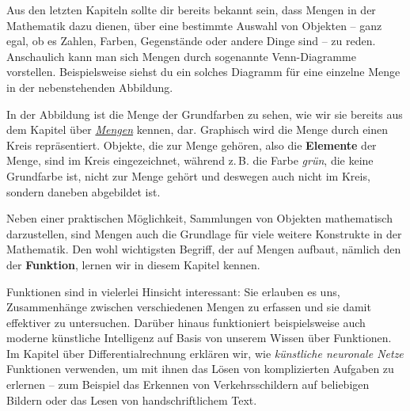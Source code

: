 \documentclass[../../main.tex]{subfiles}
\begin{document}
\label{sec:abbildungen_intuition}
Aus den letzten Kapiteln sollte dir bereits bekannt sein, dass Mengen in der Mathematik dazu dienen, über eine bestimmte Auswahl von Objekten -- ganz egal, ob es Zahlen, Farben, Gegenstände oder andere Dinge sind -- zu reden. Anschaulich kann man sich Mengen durch sogenannte Venn-Diagramme vorstellen. Beispielsweise siehst du ein solches Diagramm für eine einzelne Menge in der nebenstehenden Abbildung.


In der Abbildung ist die Menge der Grundfarben zu sehen, wie wir sie bereits aus dem Kapitel über \href{ch:mengen}{\emph{Mengen}} kennen, dar. Graphisch wird die Menge durch einen Kreis repräsentiert. Objekte, die zur Menge gehören, also die \textbf{Elemente} der Menge, sind im Kreis eingezeichnet, während z.\,B. die Farbe \emph{grün}, die keine Grundfarbe ist, nicht zur Menge gehört und deswegen auch nicht im Kreis, sondern daneben abgebildet ist.

Neben einer praktischen Möglichkeit, Sammlungen von Objekten mathematisch darzustellen, sind Mengen auch die Grundlage für viele weitere Konstrukte in der Mathematik. Den wohl wichtigsten Begriff, der auf Mengen aufbaut, nämlich den der \textbf{Funktion}, lernen wir in diesem Kapitel kennen.

Funktionen sind in vielerlei Hinsicht interessant: Sie erlauben es uns, Zusammenhänge zwischen verschiedenen Mengen zu erfassen und sie damit effektiver zu untersuchen. Darüber hinaus funktioniert beispielsweise auch moderne künstliche Intelligenz auf Basis von unserem Wissen über Funktionen. Im Kapitel über Differentialrechnung erklären wir, wie \emph{künstliche neuronale Netze} Funktionen verwenden, um mit ihnen das Lösen von komplizierten Aufgaben zu erlernen -- zum Beispiel das Erkennen von Verkehrsschildern auf beliebigen Bildern oder das Lesen von handschriftlichem Text.
\end{document}
